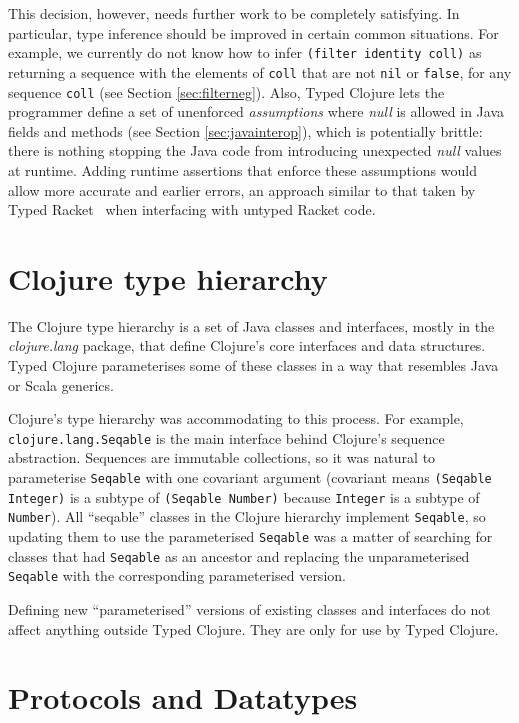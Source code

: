 This decision, however, needs further work to be completely satisfying.
In particular, type inference should be improved in certain common situations.
For example, we currently do not know how to infer \lstinline|(filter identity coll)|
as returning a sequence with the elements of \lstinline|coll| that are not \lstinline|nil| or \lstinline|false|,
for any sequence \lstinline|coll|
(see Section \ref{sec:filterneg}).
Also, Typed Clojure lets the programmer define a set of unenforced \emph{assumptions}
where \emph{null} is allowed in Java fields and methods (see Section \ref{sec:javainterop}),
which is potentially brittle: there is nothing stopping the Java code from introducing unexpected \emph{null} values at runtime.
Adding runtime assertions that enforce these assumptions would allow more
accurate and earlier errors, an approach similar to that taken by Typed Racket~\cite{Tob10} when
interfacing with untyped Racket code.

\section{Clojure type hierarchy}

The Clojure type hierarchy is a set of Java classes and interfaces, mostly in the
\emph{clojure.lang} package, that define Clojure's core 
interfaces and data structures.
Typed Clojure parameterises some of these classes in a way that resembles
Java or Scala generics.

Clojure's type hierarchy was accommodating to this process.
For example, \lstinline{clojure.lang.Seqable} is the main interface behind
Clojure's sequence abstraction. Sequences are immutable collections,
so it was natural to parameterise \lstinline{Seqable} with one covariant
argument (covariant means \lstinline|(Seqable Integer)| is
a subtype of \lstinline|(Seqable Number)| because \lstinline|Integer|
is a subtype of \lstinline|Number|).
All ``seqable'' classes in the Clojure hierarchy implement \lstinline|Seqable|,
so updating them to use the parameterised \lstinline|Seqable| was a matter of
searching for classes that had \lstinline|Seqable| as an ancestor and replacing
the unparameterised \lstinline|Seqable| with the corresponding parameterised 
version.

Defining new ``parameterised'' versions of existing classes and interfaces do 
not affect anything outside Typed Clojure.
They are only for use by Typed Clojure.

\section{Protocols and Datatypes}

